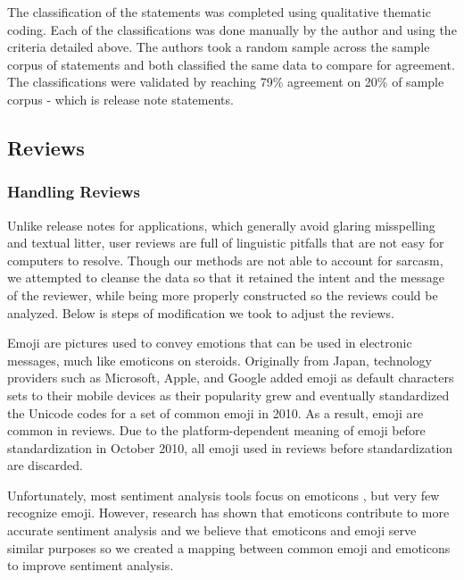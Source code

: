 \documentclass{acm_proc_article-sp}
\begin{document}
The classification of the statements was completed using qualitative thematic coding. 
Each of the classifications was done manually by the author and \hongyan using the criteria detailed above.
The authors took a random sample across the sample corpus of statements and both classified the same data to compare for agreement.
The classifications were validated by reaching 79\% agreement on 20\% of sample corpus - which is \lblCorpusSampleSize release note statements.  


\subsection{Reviews}



\subsubsection{Handling Reviews}

Unlike release notes for applications, which generally avoid glaring misspelling and textual litter, user reviews are full of linguistic pitfalls that are not easy for computers to resolve. 
Though our methods are not able to account for sarcasm, we attempted to cleanse the data so that it retained the intent and the message of the reviewer, while being more properly constructed so the reviews could be analyzed.
Below is steps of modification we took to adjust the reviews.

 Emoji are pictures used to convey emotions that can be used in electronic messages, much like emoticons on steroids.
 Originally from Japan, technology providers such as Microsoft, Apple, and Google added emoji as default characters sets to their mobile devices as their popularity grew and eventually standardized the Unicode codes for a set of common emoji in 2010.   
 As a result, emoji are common in reviews.
Due to the platform-dependent meaning of emoji before standardization in October 2010, all emoji used in reviews before standardization are discarded.
 
 Unfortunately, most sentiment analysis tools focus on emoticons , but very few recognize emoji. 
 However, research has shown that emoticons contribute to more accurate sentiment analysis  and we believe that emoticons and emoji serve similar purposes so we created a mapping between common emoji and emoticons to improve sentiment analysis. 
 
\end{document}
